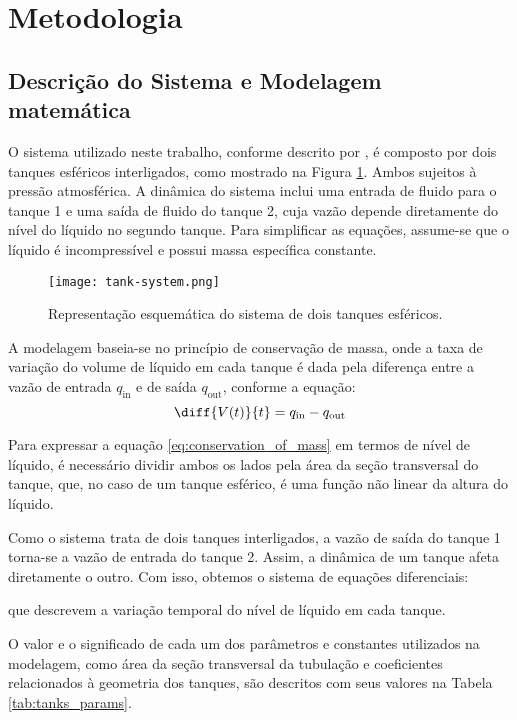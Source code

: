 \section{Metodologia}

\subsection{Descrição do Sistema e Modelagem matemática}

O sistema utilizado neste trabalho, conforme descrito por \citet{wildson_2024}, é composto por dois tanques esféricos interligados, como mostrado na Figura \ref{fig:tank-system}. Ambos sujeitos à pressão atmosférica. A dinâmica do sistema inclui uma entrada de fluido para o tanque 1 e uma saída de fluido do tanque 2, cuja vazão depende diretamente do nível do líquido no segundo tanque. Para simplificar as equações, assume-se que o líquido é incompressível e possui massa específica constante.

\begin{figure}[ht]
  \centering
  \texttt{[image: tank-system.png]}
  \caption{Representação esquemática do sistema de dois tanques esféricos.}
  \label{fig:tank-system}
\end{figure}

A modelagem baseia-se no princípio de conservação de massa, onde a taxa de variação do volume de líquido em cada tanque é dada pela diferença entre a vazão de entrada $q_{\mathrm{in}}$ e de saída $q_{\mathrm{out}}$, conforme a equação:
\begin{equation}
  \diff{V(t)}{t}=q_{\mathrm{in}}-q_{\mathrm{out}}
  \label{eq:conservation_of_mass}
\end{equation}

Para expressar a equação \ref{eq:conservation_of_mass} em termos de nível de líquido, é necessário dividir ambos os lados pela área da seção transversal do tanque, que, no caso de um tanque esférico, é uma função não linear da altura do líquido.

Como o sistema trata de dois tanques interligados, a vazão de saída do tanque 1 torna-se a vazão de entrada do tanque 2. Assim, a dinâmica de um tanque afeta diretamente o outro. Com isso, obtemos o sistema de equações diferenciais:

%
que descrevem a variação temporal do nível de líquido em cada tanque.

O valor e o significado de cada um dos parâmetros e constantes utilizados na modelagem, como área da seção transversal da tubulação e coeficientes relacionados à geometria dos tanques, são descritos com seus valores na Tabela \ref{tab:tanks_params}.

